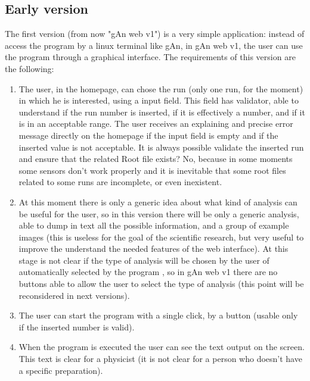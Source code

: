 \subsection{Early version}
The first version (from now "gAn web v1") is a very simple application: instead of access the program by a linux terminal like gAn, in gAn web v1, the user can 
use the program through a graphical interface. 
The requirements of this version are the following:
\begin{enumerate}

\item The user, in the homepage, can chose the run (only one run, for the moment) in which he is interested, using a input field. This field has validator, able to understand if the run number is inserted, if it is effectively a number, and if it is in an acceptable range. The user receives an explaining and precise error message directly on the homepage if the input field is empty and if the inserted value is not acceptable. It is always possible validate the inserted run and ensure that the related Root file exists? No, because in some moments some sensors don't work properly and it is inevitable that some root files related to some runs are incomplete, or even inexistent.

\item At this moment there is only a generic idea about what kind of analysis can be useful for the user, so in this version there will be only a generic analysis, able to dump in text all the possible information, and a group of example images (this is useless for the goal of the scientific research, but very useful to improve the understand the needed features of the web interface).
At this stage is not clear if the type of analysis will be chosen by the user of automatically selected by the program , so in gAn web v1 there are no buttons able to allow the user to select the type of analysis (this point will be reconsidered in next versions).

\item The user can start the program with a single click, by a button (usable only if the inserted number is valid).

\item When the program is executed the user can see the text output on the screen. This text is clear for a physicist (it is not clear for a person who doesn't have a specific preparation). 


\end{enumerate}
